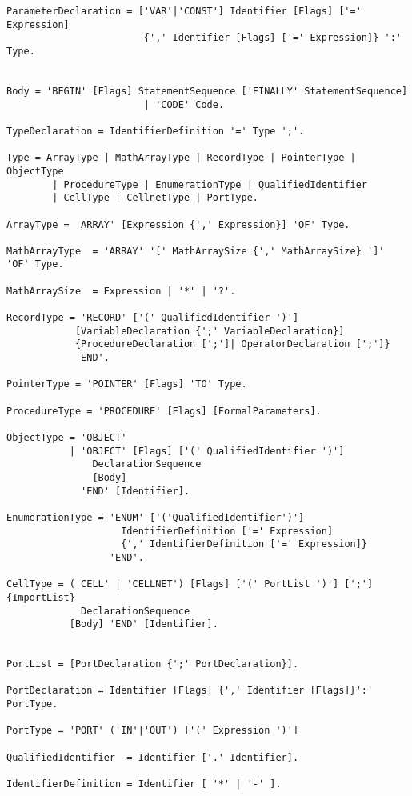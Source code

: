 \documentclass[a4wide,11pt]{article}
\begin{document}
\begin{lstlisting}[style=EBNF]
ParameterDeclaration = ['VAR'|'CONST'] Identifier [Flags] ['=' Expression] 
						{',' Identifier [Flags] ['=' Expression]} ':' Type.

						
Body = 'BEGIN' [Flags] StatementSequence ['FINALLY' StatementSequence]
						| 'CODE' Code.
						
TypeDeclaration = IdentifierDefinition '=' Type ';'.

Type = ArrayType | MathArrayType | RecordType | PointerType | ObjectType 
        | ProcedureType | EnumerationType | QualifiedIdentifier
        | CellType | CellnetType | PortType.

ArrayType = 'ARRAY' [Expression {',' Expression}] 'OF' Type.

MathArrayType  = 'ARRAY' '[' MathArraySize {',' MathArraySize} ']' 'OF' Type.

MathArraySize  = Expression | '*' | '?'.

RecordType = 'RECORD' ['(' QualifiedIdentifier ')']
            [VariableDeclaration {';' VariableDeclaration}] 
            {ProcedureDeclaration [';']| OperatorDeclaration [';']}
            'END'.

PointerType = 'POINTER' [Flags] 'TO' Type.

ProcedureType = 'PROCEDURE' [Flags] [FormalParameters].

ObjectType = 'OBJECT' 
           | 'OBJECT' [Flags] ['(' QualifiedIdentifier ')'] 
               DeclarationSequence 
               [Body] 
             'END' [Identifier].

EnumerationType = 'ENUM' ['('QualifiedIdentifier')'] 
                    IdentifierDefinition ['=' Expression]
                    {',' IdentifierDefinition ['=' Expression]} 
                  'END'.

CellType = ('CELL' | 'CELLNET') [Flags] ['(' PortList ')'] [';'] {ImportList} 
             DeclarationSequence 
           [Body] 'END' [Identifier].           
                  

PortList = [PortDeclaration {';' PortDeclaration}].

PortDeclaration = Identifier [Flags] {',' Identifier [Flags]}':' PortType.

PortType = 'PORT' ('IN'|'OUT') ['(' Expression ')']

QualifiedIdentifier  = Identifier ['.' Identifier].

IdentifierDefinition = Identifier [ '*' | '-' ].


\end{lstlisting}
\end{document}
